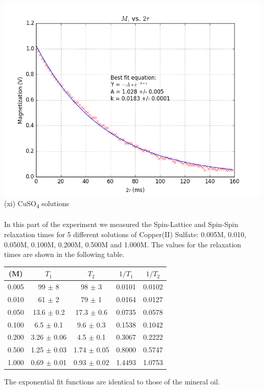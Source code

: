 \documentclass{article}
\begin{document}
{\begin{multicols}{2}
\label{fig:18}
\includegraphics[width=\linewidth]{pic-for-report/mineral-water-T2-MG.png}
\label{fig:19}
\justify
(xi) CuSO\textsubscript{4} solutions \\
\\
In this part of the experiment we measured the Spin-Lattice and Spin-Spin 
relaxation times for 5 different solutions of Copper(II) Sulfate: 0.005M, 
0.010, 0.050M, 0.100M, 0.200M, 0.500M and 1.000M. The values for the relaxation 
times are shown in the following table.
\begin{tabular}{|c|c|c|c|c|}
\hline
 (M) & $T_1$ & $T_2$ & $1/T_1$ & $1/T_2$ \\ \hline
0.005 & 99 $\pm$ 8 & 98 $\pm$ 3 & 0.0101 & 0.0102 \\ \hline
0.010 & 61 $\pm$ 2 & 79 $\pm$ 1 & 0.0164 & 0.0127 \\ \hline
0.050 & 13.6 $\pm$ 0.2 & 17.3 $\pm$ 0.6 & 0.0735 & 0.0578 \\ \hline
0.100 & 6.5 $\pm$ 0.1 & 9.6 $\pm$ 0.3 & 0.1538 & 0.1042 \\ \hline
0.200 & 3.26 $\pm$ 0.06 & 4.5 $\pm$ 0.1 & 0.3067 & 0.2222 \\ \hline
0.500 & 1.25 $\pm$ 0.03 & 1.74 $\pm$ 0.05 & 0.8000 & 0.5747 \\ \hline
1.000 & 0.69 $\pm$ 0.01 & 0.93 $\pm$ 0.02 & 1.4493 & 1.0753 \\ \hline
\end{tabular}
The exponential fit functions are identical to those of the mineral oil.
\center

\end{multicols}}
\end{document}
